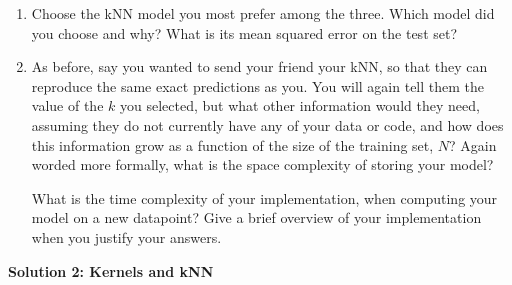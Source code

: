 \documentclass[submit]{harvardml}
\begin{document}
\begin{problem}
\begin{enumerate}
\item Choose the kNN model you most prefer among the three. Which model did you choose and why? What is its mean squared error on the test set?

\item As before, say you wanted to send your friend your kNN, so that they can reproduce the same exact predictions as you. You will again tell them the value of the $k$ you selected, but what other information would they need, assuming they do not currently have any of your data or code, and how does this information grow as a function of the size of the training set, $N$? Again worded more formally, what is the space complexity of storing your model?

What is the time complexity of your implementation, when computing your model on a new datapoint? Give a brief overview of your implementation when you justify your answers. 
\end{enumerate}

\end{problem}

\newpage
 
{\bf Solution 2: Kernels and kNN}
\end{document}
